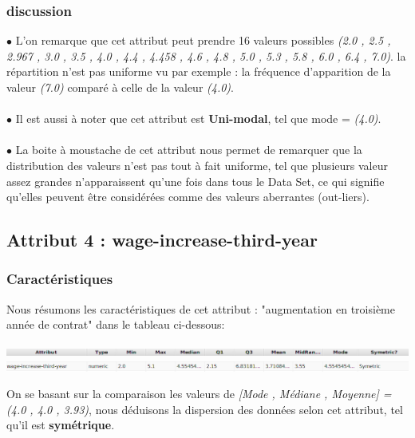 \documentclass[12pt,a4paper,oneside]{book}
\begin{document}
	\subsubsection{discussion}	
	$\bullet $ L'on remarque que cet attribut peut prendre 16 valeurs possibles \textit{(2.0 , 2.5 , 2.967 , 3.0 , 3.5 , 4.0 , 4.4 , 4.458 , 4.6 , 4.8 , 5.0 , 5.3 , 5.8  , 6.0 , 6.4 , 7.0)}. la répartition n'est pas uniforme vu par exemple : la fréquence d'apparition de la valeur \textit{(7.0)} comparé à celle de la valeur \textit{(4.0)}.\\
	\textbf{ }\\
	$\bullet $ Il est aussi à noter que cet attribut est \textbf{Uni-modal}, tel que mode = \textit{(4.0)}.\\
	\textbf{ }\\
	$\bullet $ La boite à moustache de cet attribut nous permet de remarquer que la distribution des valeurs n'est pas tout à fait uniforme, tel que plusieurs valeur assez grandes n'apparaissent qu'une fois dans tous le Data Set, ce qui signifie qu'elles peuvent être considérées comme des valeurs aberrantes (out-liers).
	
	\newpage
	
	
	\subsection{Attribut 4 : wage-increase-third-year }
	\subsubsection{Caractéristiques}
	Nous résumons les caractéristiques de cet attribut : "augmentation en troisième année de contrat" dans le tableau ci-dessous:
	\begin{center}
		\includegraphics[width=1\textwidth]{screens/att.png}\\ \includegraphics[width=1\textwidth]{screens/att-4.png}%
		\label{labelname}%
	\end{center}
	
	On se basant sur la comparaison les valeurs de \textit{[Mode , Médiane , Moyenne] = (4.0 , 4.0 , 3.93)}, nous déduisons la dispersion des données selon cet attribut, tel qu'il est \textbf{symétrique}.
	
\end{document}
